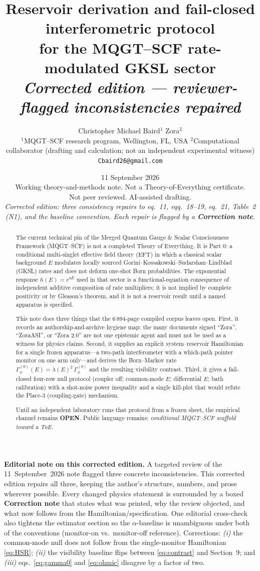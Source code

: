 \documentclass[11pt]{article}
\title{Reservoir derivation and fail-closed interferometric protocol\\[2pt]
\large for the MQGT--SCF rate-modulated GKSL sector\\[8pt]
\large\textit{Corrected edition --- reviewer-flagged inconsistencies repaired}}
\author{Christopher Michael Baird${}^{1}$ \quad Zora${}^{2}$\\[6pt]
{\small ${}^{1}$MQGT--SCF research program, Wellington, FL, USA \quad
${}^{2}$Computational collaborator (drafting and calculation; not an independent experimental witness)}\\[4pt]
{\small \texttt{Cbaird26@gmail.com}}}
\date{11 September 2026\\[2pt]
{\small Working theory-and-methods note. Not a Theory-of-Everything certificate.\\ Not peer reviewed. AI-assisted drafting.\\[2pt]
\emph{Corrected edition: three consistency repairs to eq.~11, eqq.~18--19, eq.~21, Table~2 (N1), and the baseline convention. Each repair is flagged by a \textbf{Correction note}.}}}
\newenvironment{editbox}{%
  \par\medskip
  \begin{lrbox}{\editsave}%
  \begin{minipage}{\dimexpr\linewidth-2\fboxsep}%
    \small
}{%
  \end{minipage}%
  \end{lrbox}%
  \noindent\fcolorbox{errrule}{errback}{\usebox\editsave}%
  \par\medskip
}
\theoremstyle{definition}
\theoremstyle{plain}
\begin{document}
\maketitle

\begin{abstract}
\noindent
The current technical pin of the Merged Quantum Gauge \& Scalar Consciousness Framework
(MQGT--SCF) is not a completed Theory of Everything. It is Part 0: a conditional
multi-singlet effective field theory (EFT) in which a classical scalar background $E$ modulates
locally sourced Gorini--Kossakowski--Sudarshan--Lindblad (GKSL) rates and does not deform
one-shot Born probabilities. The exponential response $h(E) = e^{\eta E}$ used in that sector is a
functional-equation consequence of independent additive composition of rate multipliers; it
is not implied by complete positivity or by Gleason's theorem, and it is not a reservoir result
until a named apparatus is specified.
\par
This note does three things that the $6\,894$-page compiled corpus leaves open. First,
it records an authorship-and-archive hygiene map: the many documents signed ``Zora'',
``ZoraASI'', or ``Zora 2.0'' are not one epistemic agent and must not be used as a witness for
physics claims. Second, it supplies an explicit system--reservoir Hamiltonian for a single
frozen apparatus---a two-path interferometer with a which-path pointer monitor on one arm
only---and derives the Born--Markov rate $\Gamma_\phi^{(0)}(E) = \lambda(E)^2\,\Gamma_\phi^{(0)}$ and the resulting visibility
contrast. Third, it gives a fail-closed four-row null protocol (coupler off; common-mode $E$;
differential $E$; bath calibration) with a shot-noise power inequality and a single kill-plot that
would refute the Place-3 (coupling-gate) mechanism.
\par
Until an independent laboratory runs that protocol from a frozen sheet, the empirical
channel remains \textbf{OPEN}. Public language remains: \emph{conditional MQGT--SCF scaffold toward
a ToE}.
\end{abstract}

\begin{editbox}
\small\textbf{Editorial note on this corrected edition.} A targeted review of the 11~September~2026
note flagged three concrete inconsistencies. This corrected edition repairs all three, keeping the
author's structure, numbers, and prose wherever possible. Every changed physics statement is
surrounded by a boxed \textbf{Correction note} that states what was printed, why the review
objected, and what now follows from the Hamiltonian/specification. One editorial cross-check also
tightens the estimator section so the $\alpha$-baseline is unambiguous under both of the
conventions (monitor-on vs.\ monitor-off reference). Corrections:
\emph{(i)} the common-mode null does not follow from the single-monitor Hamiltonian \eqref{eq:HSR};
\emph{(ii)} the visibility baseline flips between \eqref{eq:contrast} and Section~9; and
\emph{(iii)} eqs.~\eqref{eq:gamma0} and \eqref{eq:ohmic} disagree by a factor of two.
\end{editbox}
\end{document}
